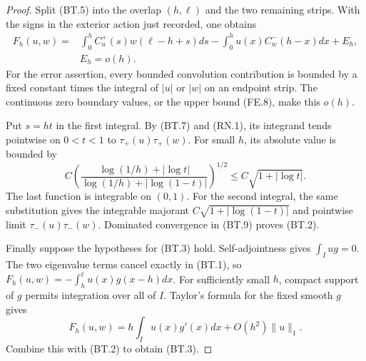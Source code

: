 \begin{proof}
Split (BT.5) into the overlap \((h,\ell)\) and the two remaining
strips.  With the signs in the exterior action just recorded,
one obtains
\[
 \begin{split}
 F_h(u,w)={}&\int_0^h C_u^+(s)w(\ell-h+s)ds
              -\int_0^h u(x)C_w^-(h-x)dx+E_h,\\
                    &E_h=o(h).
 \end{split}                                             \tag{BT.9}
\]
For the error assertion, every bounded convolution contribution
is bounded by a fixed constant times the integral of \(|u|\)
or \(|w|\) on an endpoint strip.
The continuous zero boundary values, or the upper bound (FE.8),
make this \(o(h)\).

Put \(s=ht\) in the first integral.  By (BT.7) and (RN.1),
its integrand tends pointwise on \(0<t<1\) to
\(\tau_+(u)\tau_+(w)\).
For small \(h\), its absolute value is bounded by
\[
 C\left(\frac{\log(1/h)+|\log t|}
                   {\log(1/h)+|\log(1-t)|}\right)^{1/2}
                          \leq C\sqrt{1+|\log t|}.       \tag{BT.10}
\]
The last function is integrable on \((0,1)\).
For the second integral, the same substitution gives the
integrable majorant \(C\sqrt{1+|\log(1-t)|}\) and pointwise
limit \(\tau_-(u)\tau_-(w)\).
Dominated convergence in (BT.9) proves (BT.2).

Finally suppose the hypotheses for (BT.3) hold.
Self-adjointness gives \(\int_Iug=0\).
The two eigenvalue terms cancel exactly in (BT.1), so
\(F_h(u,w)=-\int_h^\ell u(x)g(x-h)dx\).
For sufficiently small \(h\), compact support of \(g\) permits
integration over all of \(I\).
Taylor's formula for the fixed smooth \(g\) gives
\[
 F_h(u,w)=h\int_Iu(x)g'(x)dx+O(h^2)\|u\|_1.
\]
Combine this with (BT.2) to obtain (BT.3).
\end{proof}

